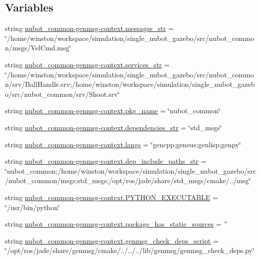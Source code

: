 \subsection*{Variables}
\begin{DoxyCompactItemize}
\item 
string \hyperlink{namespacenubot__common-genmsg-context_a9d82d20e4ffa677c598751d6630dc734}{nubot\-\_\-common-\/genmsg-\/context.\-messages\-\_\-str} = \char`\"{}/home/winston/workspace/simulation/single\-\_\-nubot\-\_\-gazebo/src/nubot\-\_\-common/msgs/Vel\-Cmd.\-msg\char`\"{}
\item 
string \hyperlink{namespacenubot__common-genmsg-context_a1e2a824c1778c805a4593863a72ba35e}{nubot\-\_\-common-\/genmsg-\/context.\-services\-\_\-str} = \char`\"{}/home/winston/workspace/simulation/single\-\_\-nubot\-\_\-gazebo/src/nubot\-\_\-common/srv/Ball\-Handle.\-srv;/home/winston/workspace/simulation/single\-\_\-nubot\-\_\-gazebo/src/nubot\-\_\-common/srv/Shoot.\-srv\char`\"{}
\item 
string \hyperlink{namespacenubot__common-genmsg-context_aa7e82af182943505146665259b8e1ce9}{nubot\-\_\-common-\/genmsg-\/context.\-pkg\-\_\-name} = \char`\"{}nubot\-\_\-common\char`\"{}
\item 
string \hyperlink{namespacenubot__common-genmsg-context_acb3057b57eb9458421378baa13f383d0}{nubot\-\_\-common-\/genmsg-\/context.\-dependencies\-\_\-str} = \char`\"{}std\-\_\-msgs\char`\"{}
\item 
string \hyperlink{namespacenubot__common-genmsg-context_ad47fe39b5ca574c609a0a44451d67ebe}{nubot\-\_\-common-\/genmsg-\/context.\-langs} = \char`\"{}gencpp;geneus;genlisp;genpy\char`\"{}
\item 
string \hyperlink{namespacenubot__common-genmsg-context_a3cb8468ce84e82ac5e2b66290f260f4c}{nubot\-\_\-common-\/genmsg-\/context.\-dep\-\_\-include\-\_\-paths\-\_\-str} = \char`\"{}nubot\-\_\-common;/home/winston/workspace/simulation/single\-\_\-nubot\-\_\-gazebo/src/nubot\-\_\-common/msgs;std\-\_\-msgs;/opt/ros/jade/share/std\-\_\-msgs/cmake/../msg\char`\"{}
\item 
string \hyperlink{namespacenubot__common-genmsg-context_a07f30a33447f3b83a20605f1732e2763}{nubot\-\_\-common-\/genmsg-\/context.\-P\-Y\-T\-H\-O\-N\-\_\-\-E\-X\-E\-C\-U\-T\-A\-B\-L\-E} = \char`\"{}/usr/bin/python\char`\"{}
\item 
string \hyperlink{namespacenubot__common-genmsg-context_a9b23bed4614ce829e09eb98736bbcfb6}{nubot\-\_\-common-\/genmsg-\/context.\-package\-\_\-has\-\_\-static\-\_\-sources} = ''
\item 
string \hyperlink{namespacenubot__common-genmsg-context_a32a0523eb31dd66d816b3d32bd6aa2b5}{nubot\-\_\-common-\/genmsg-\/context.\-genmsg\-\_\-check\-\_\-deps\-\_\-script} = \char`\"{}/opt/ros/jade/share/genmsg/cmake/../../../lib/genmsg/genmsg\-\_\-check\-\_\-deps.\-py\char`\"{}
\end{DoxyCompactItemize}
